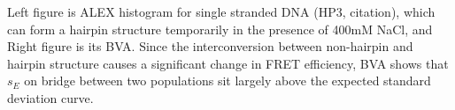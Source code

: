 Left figure is ALEX histogram for single stranded DNA (HP3, citation), which can form a hairpin structure temporarily in the presence of 400mM NaCl, and Right figure is its BVA. Since the interconversion between non-hairpin and hairpin structure causes a significant change in FRET efficiency, BVA shows that $s_E$ on bridge between two populations sit largely above the expected standard deviation curve.